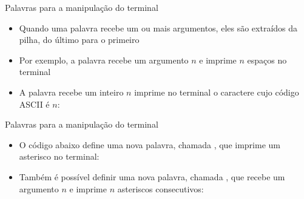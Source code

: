 \begin{frame}[fragile]{Palavras para a manipulação do terminal}

    \begin{itemize}
        \item Quando uma palavra recebe um ou mais argumentos, eles são extraídos da pilha, 
            do último para o primeiro

        \item Por exemplo, a palavra  recebe um argumento $n$ e imprime $n$
            espaços no terminal


        \vspace{0.1in}

        \item A palavra  recebe um inteiro $n$ imprime no terminal o caractere
            cujo código ASCII é $n$:


    \end{itemize}

\end{frame}

\begin{frame}[fragile]{Palavras para a manipulação do terminal}

    \begin{itemize}
        \item O código abaixo define uma nova palavra, chamada , que imprime um 
            asterisco no terminal:


        \vspace{0.1in}

        \item Também é possível definir uma nova palavra, chamada , que recebe
            um argumento $n$ e imprime $n$ asteriscos consecutivos:


    \end{itemize}

\end{frame}

